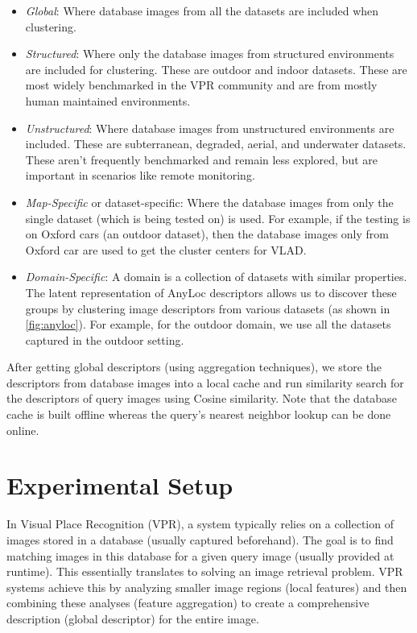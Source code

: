 \begin{itemize}
    \item \emph{Global}: Where database images from all the datasets
        are included when clustering.
    \item \emph{Structured}: Where only the database images from
        structured environments are included for clustering. These are
        outdoor and indoor datasets. These are most widely benchmarked
        in the VPR community and are from mostly human maintained
        environments.
    \item \emph{Unstructured}: Where database images from unstructured
        environments are included. These are subterranean, degraded,
        aerial, and underwater datasets. These aren't frequently
        benchmarked and remain less explored, but are important in
        scenarios like remote monitoring.
    \item \emph{Map-Specific} or dataset-specific: Where the database
        images from only the single dataset (which is being tested on)
        is used. For example, if the testing is on Oxford cars (an
        outdoor dataset), then the database images only from Oxford
        car are used to get the cluster centers for VLAD.
    \item \emph{Domain-Specific}: A domain is a collection of datasets
        with similar properties. The latent representation of AnyLoc
        descriptors allows us to discover these groups by clustering
        image descriptors from various datasets (as shown in
        \cref{fig:anyloc}). For example, for the outdoor domain, we
        use all the datasets captured in the outdoor setting.
\end{itemize}

After getting global descriptors (using aggregation techniques), we
store the descriptors from database images into a local cache and 
run similarity search for the descriptors of query images using Cosine
similarity. Note that the database cache is built offline whereas the
query's nearest neighbor lookup can be done online. 

\section{Experimental Setup}

In Visual Place Recognition (VPR), a system typically relies on a
collection of images stored in a database (usually captured
beforehand). The goal is to find matching images in this database for
a given query image (usually provided at runtime). This essentially
translates to solving an image retrieval problem. VPR systems achieve
this by analyzing smaller image regions (local features) and then
combining these analyses (feature aggregation) to create a
comprehensive description (global descriptor) for the entire image.

